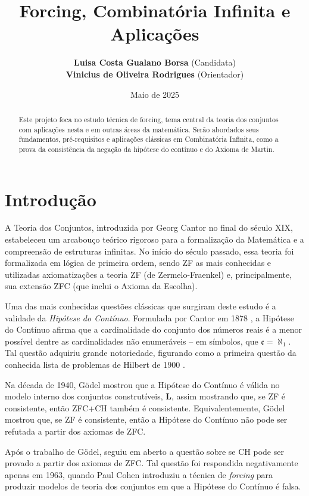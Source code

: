 \documentclass{article}
\author{
   \textbf{Luisa Costa Gualano Borsa} (Candidata)\\
    \textbf{Vinicius de Oliveira Rodrigues} (Orientador)\\
}
\title{\textbf{Forcing, Combinatória Infinita e Aplicações}}
\date{Maio de 2025}
\begin{document}
\maketitle
\begin{abstract}
    Este projeto foca no estudo técnica de forcing, tema central da teoria dos conjuntos com aplicações nesta e em outras áreas da matemática. Serão abordados seus fundamentos, pré-requisitos e aplicações clássicas em Combinatória Infinita, como a prova da consistência da negação da hipótese do contínuo e do Axioma de Martin.
\end{abstract}



\section{Introdução}
    A Teoria dos Conjuntos, introduzida por Georg Cantor no final do século XIX, estabeleceu um arcabouço teórico rigoroso para a formalização da Matemática e a compreensão de estruturas infinitas. No início do século passado, essa teoria foi formalizada em lógica de primeira ordem, sendo ZF as mais conhecidas e utilizadas axiomatizações a teoria ZF (de Zermelo-Fraenkel) e, principalmente, sua extensão ZFC (que inclui o Axioma da Escolha).

    Uma das mais conhecidas questões clássicas que surgiram deste estudo é a validade da \emph{Hipótese do Contínuo}.
    Formulada por Cantor em 1878 \cite{cantor1878beitrag}, a Hipótese do Contínuo afirma que a cardinalidade do conjunto dos números reais é a menor possível dentre as cardinalidades não enumeráveis -- em símbolos, que $\mathfrak c=\aleph_1$.
    Tal questão adquiriu grande notoriedade, figurando como a primeira questão da conhecida lista de problemas de Hilbert de 1900 \cite{hilbert1900mathematische}.

    Na década de 1940, Gödel mostrou que a Hipótese do Contínuo é válida no modelo interno dos conjuntos construtíveis, $\mathbf{L}$, assim mostrando que, se ZF é consistente, então ZFC+CH também é consistente.
    Equivalentemente, Gödel mostrou que, se ZF é consistente, então a Hipótese do Contínuo não pode ser refutada a partir dos axiomas de ZFC.
    
    Após o trabalho de Gödel, seguiu em aberto a questão sobre se CH pode ser provado a partir dos axiomas de ZFC.
    Tal questão foi respondida negativamente apenas em 1963, quando Paul Cohen \cite{cohen1963independence} introduziu a técnica de \emph{forcing} para produzir modelos de teoria dos conjuntos em que a Hipótese do Contínuo é falsa.
\end{document}
